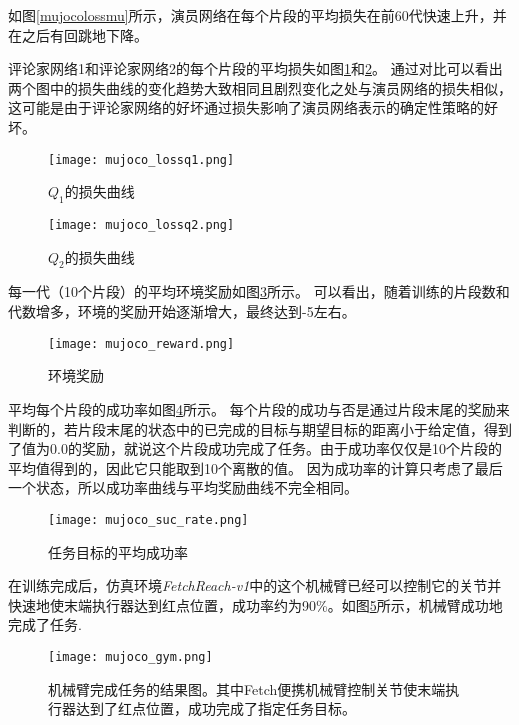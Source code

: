         如图\ref{mujocolossmu}所示，演员网络在每个片段的平均损失在前60代快速上升，并在之后有回跳地下降。

        评论家网络1和评论家网络2的每个片段的平均损失如图\ref{mujocolossq1}和\ref{mujocolossq2}。
        通过对比可以看出两个图中的损失曲线的变化趋势大致相同且剧烈变化之处与演员网络的损失相似，这可能是由于评论家网络的好坏通过损失影响了演员网络表示的确定性策略的好坏。

        \begin{figure}[htpb]
        \centering
        \texttt{[image: mujoco\_lossq1.png]}
        \caption{$Q_1$的损失曲线}
        \label{mujocolossq1} 
        \end{figure}

        \begin{figure}[htpb]
        \centering
        \texttt{[image: mujoco\_lossq2.png]}
        \caption{$Q_2$的损失曲线}
        \label{mujocolossq2} 
        \end{figure}

        每一代（10个片段）的平均环境奖励如图\ref{mujocoreward}所示。
        可以看出，随着训练的片段数和代数增多，环境的奖励开始逐渐增大，最终达到-5左右。
        \begin{figure}[htpb]
        \centering
        \texttt{[image: mujoco\_reward.png]}
        \caption{环境奖励}
            \label{mujocoreward}
        \end{figure}

        平均每个片段的成功率如图\ref{mujocosuc}所示。
        每个片段的成功与否是通过片段末尾的奖励来判断的，若片段末尾的状态中的已完成的目标与期望目标的距离小于给定值，得到了值为0.0的奖励，就说这个片段成功完成了任务。由于成功率仅仅是10个片段的平均值得到的，因此它只能取到10个离散的值。
        因为成功率的计算只考虑了最后一个状态，所以成功率曲线与平均奖励曲线不完全相同。
        \begin{figure}[htpb]
        \centering
        \texttt{[image: mujoco\_suc\_rate.png]}
        \caption{任务目标的平均成功率}
            \label{mujocosuc}
        \end{figure}

        在训练完成后，仿真环境\emph{FetchReach-v1}中的这个机械臂已经可以控制它的关节并快速地使末端执行器达到红点位置，成功率约为90\%。如图\ref{mujoco_gym}所示，机械臂成功地完成了任务.
        \begin{figure}[htpb]
        \centering
        \texttt{[image: mujoco\_gym.png]}
            \caption{机械臂完成任务的结果图。其中Fetch便携机械臂控制关节使末端执行器达到了红点位置，成功完成了指定任务目标。}
            \label{mujoco_gym}
        \end{figure}

